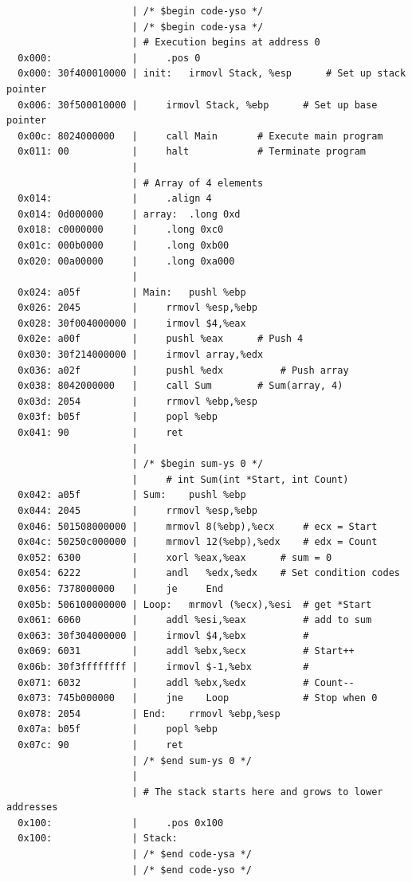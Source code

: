 \documentclass[12pt]{article}
\begin{document}
\begin{CJK*}{GB}{gbsn}
\begin{verbatim}
                      | /* $begin code-yso */
                      | /* $begin code-ysa */
                      | # Execution begins at address 0 
  0x000:              |     .pos 0 
  0x000: 30f400010000 | init:   irmovl Stack, %esp      # Set up stack pointer  
  0x006: 30f500010000 |     irmovl Stack, %ebp      # Set up base pointer   
  0x00c: 8024000000   |     call Main       # Execute main program
  0x011: 00           |     halt            # Terminate program 
                      | 
                      | # Array of 4 elements
  0x014:              |     .align 4    
  0x014: 0d000000     | array:  .long 0xd
  0x018: c0000000     |     .long 0xc0
  0x01c: 000b0000     |     .long 0xb00
  0x020: 00a00000     |     .long 0xa000    
                      | 
  0x024: a05f         | Main:   pushl %ebp 
  0x026: 2045         |     rrmovl %esp,%ebp
  0x028: 30f004000000 |     irmovl $4,%eax  
  0x02e: a00f         |     pushl %eax      # Push 4
  0x030: 30f214000000 |     irmovl array,%edx
  0x036: a02f         |     pushl %edx          # Push array
  0x038: 8042000000   |     call Sum        # Sum(array, 4)
  0x03d: 2054         |     rrmovl %ebp,%esp
  0x03f: b05f         |     popl %ebp
  0x041: 90           |     ret 
                      | 
                      | /* $begin sum-ys 0 */
                      |     # int Sum(int *Start, int Count)
  0x042: a05f         | Sum:    pushl %ebp
  0x044: 2045         |     rrmovl %esp,%ebp
  0x046: 501508000000 |     mrmovl 8(%ebp),%ecx     # ecx = Start
  0x04c: 50250c000000 |     mrmovl 12(%ebp),%edx    # edx = Count
  0x052: 6300         |     xorl %eax,%eax      # sum = 0
  0x054: 6222         |     andl   %edx,%edx    # Set condition codes
  0x056: 7378000000   |     je     End
  0x05b: 506100000000 | Loop:   mrmovl (%ecx),%esi  # get *Start
  0x061: 6060         |     addl %esi,%eax          # add to sum
  0x063: 30f304000000 |     irmovl $4,%ebx          # 
  0x069: 6031         |     addl %ebx,%ecx          # Start++
  0x06b: 30f3ffffffff |     irmovl $-1,%ebx         # 
  0x071: 6032         |     addl %ebx,%edx          # Count--
  0x073: 745b000000   |     jne    Loop             # Stop when 0
  0x078: 2054         | End:    rrmovl %ebp,%esp
  0x07a: b05f         |     popl %ebp
  0x07c: 90           |     ret
                      | /* $end sum-ys 0 */
                      | 
                      | # The stack starts here and grows to lower addresses
  0x100:              |     .pos 0x100      
  0x100:              | Stack:   
                      | /* $end code-ysa */
                      | /* $end code-yso */
\end{verbatim}


\end{CJK*}
\end{document}
